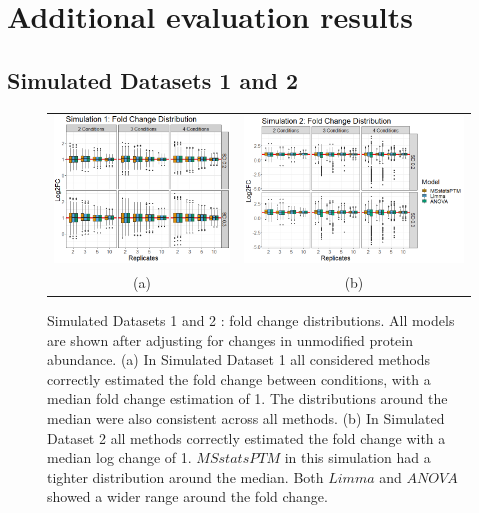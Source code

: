 \documentclass{mcp}
\begin{document}
\clearpage
\section{Additional evaluation results}
\label{sec:experiments}

\subsection{Simulated Datasets 1 and 2}

\begin{figure}[ht]
\centering
 \begin{tabular}{cc}
	\includegraphics[width=.445\textwidth]{sim_new/SuppFigure2a.png}
	&
	\includegraphics[width=.56\textwidth]{sim_new/SuppFigure2b.png}\\
	(a)&(b)
\end{tabular}
\caption{Simulated Datasets 1 and 2 : fold change distributions. All models are shown after adjusting for changes in unmodified protein abundance. (a) In Simulated Dataset 1 all considered methods correctly estimated the fold change between conditions, with a median fold change estimation of 1. The distributions around the median were also consistent across all methods. (b) In Simulated Dataset 2 all methods correctly estimated the fold change with a median log change of 1. $MSstatsPTM$ in this simulation had a  tighter distribution around the median. Both $Limma$ and $ANOVA$ showed a wider range around the fold change.}

\label{fig:fc_boxplot}
\end{figure}
\end{document}
